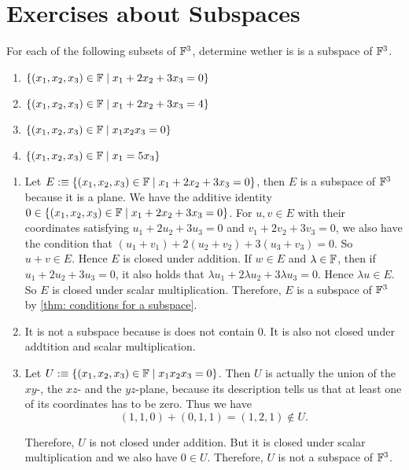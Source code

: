 \section*{Exercises about Subspaces}

\begin{xrcs}
  For each of the following subsets of $\mathbb{F}^3$, determine wether is is a subspace of $\mathbb{F}^3$.
  \begin{enumerate}
    \item $\{(x_1, x_2, x_3) \in \mathbb{F} \mid x_1 + 2x_2 + 3 x_3 = 0\}$
    \item $\{(x_1, x_2, x_3) \in \mathbb{F} \mid x_1 + 2x_2 + 3 x_3 = 4\}$
    \item $\{(x_1, x_2, x_3) \in \mathbb{F} \mid x_1 x_2 x_3 = 0\}$
    \item $\{(x_1, x_2, x_3) \in \mathbb{F} \mid x_1 = 5x_3\}$
  \end{enumerate}

  \begin{xsol}
    \begin{enumerate}
    \item Let $E :\equiv \{(x_1, x_2, x_3) \in \mathbb{F} \mid x_1 + 2x_2 + 3 x_3 = 0\}$, then $E$ is a subspace of $\mathbb{F}^3$ because it is a plane. We have the additive identity  $0 \in \{(x_1, x_2, x_3) \in \mathbb{F} \mid x_1 + 2x_2 + 3 x_3 = 0\}$. For $u,v \in E$ with their coordinates satisfying $u_1 + 2u_2 + 3u_3 = 0$ and $v_1 + 2v_2 + 3v_3 = 0$, we also have the condition that $(u_1 + v_1) + 2 (u_2 + v_2) + 3(u_3 + v_3)= 0$. So $u+v \in E$. Hence $E$ is closed under addition. If $w \in E$ and $\lambda \in \mathbb{F}$, then if $u_1 + 2u_2 + 3u_3 = 0$, it also holds that $\lambda u_1 + 2\lambda u_2 + 3\lambda u_3 = 0$. Hence $\lambda u \in E$. So $E$ is closed under scalar multiplication. Therefore, $E$ is a subspace of $\mathbb{F}^3$ by \ref{thm: conditions for a subspace}.

    \item It is not a subspace because is does not contain $0$. It is also not closed under addtition and scalar multiplication.

    \item Let $U :\equiv \{(x_1, x_2, x_3) \in \mathbb{F} \mid x_1 x_2 x_3 = 0\}$. Then $U$ is actually the union of the $xy$-, the $xz$- and the $yz$-plane, because its description tells us that at least one of its coordinates has to be zero. Thus we have
    \[
    (1,1,0) + (0,1,1) = (1,2,1) \notin U.
    \]

    Therefore, $U$ is not closed under addition. But it is closed under scalar multiplication and we also have $0 \in U$. Therefore, $U$ is not a subspace of $\mathbb{F}^3$.


\end{enumerate}
\end{xsol}
\end{xrcs}
